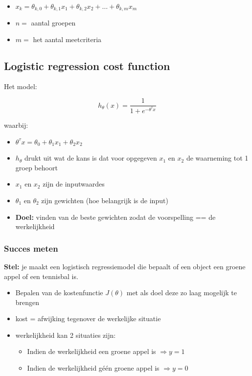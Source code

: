 \documentclass{article}
\begin{document}
\begin{itemize}
    \item $x_k = \theta_{k,0} + \theta_{k,1}x_1 + \theta_{k,2}x_2 + \dots + \theta_{k,m}x_m$
    \item $n =$ aantal groepen
    \item $m =$ het aantal meetcriteria
\end{itemize}

\subsection{Logistic regression cost function}

Het model:

\begin{equation}
h_{\theta}(x) = \frac{1}{1 + e^{-\theta^{\tau}x}}
\end{equation}

waarbij:

\begin{itemize}
    \item $\theta^{\tau}x = \theta_0 + \theta_1x_1 + \theta_2x_2$
    \item $h_{\theta}$ drukt uit wat de kans is dat voor opgegeven $x_1$ en $x_2$ de waarneming tot 1 groep behoort
    \item $x_1$ en $x_2$ zijn de inputwaardes
    \item $\theta_1$ en $\theta_2$ zijn gewichten (hoe belangrijk is de input)
    \item \textbf{Doel: } vinden van de beste gewichten zodat de voorspelling == de werkelijkheid
\end{itemize}

\subsubsection{Succes meten}

\textbf{Stel:} je maakt een logistisch regressiemodel die bepaalt of een object een groene appel of een tennisbal is. 

\begin{itemize}
    \item Bepalen van de kostenfunctie $J(\theta)$ met als doel deze zo laag mogelijk te brengen
    \item kost = afwijking tegenover de werkelijke situatie
    \item werkelijkheid kan 2 situaties zijn:
    \begin{itemize}
        \item Indien de werkelijkheid een groene appel is $\Rightarrow y = 1$ 
        \item Indien de werkelijkheid géén groene appel is $\Rightarrow y = 0$ 
    \end{itemize}
\end{itemize}
\end{document}

